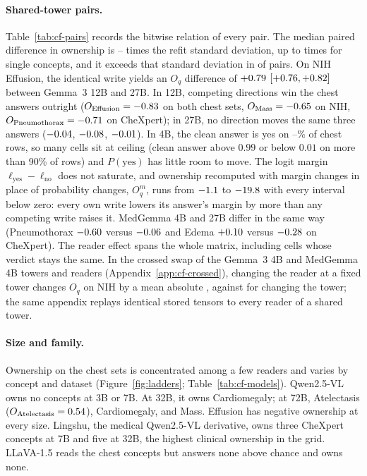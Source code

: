 \documentclass{article}
\begin{document}
\paragraph{Shared-tower pairs.} Table~\ref{tab:cf-pairs} records the bitwise relation of every pair. The median paired difference in ownership is \cfPairsRatioMin{}--\cfPairsRatioMax{} times the refit standard deviation, up to \cfPairsRatioSingleMax{} times for single concepts, and it exceeds that standard deviation in \cfPairsRatioAboveOne{} of \cfPairsRatioN{} pairs. On NIH Effusion, the identical write yields an $O_q$ difference of $+0.79$ $[+0.76,+0.82]$ between Gemma~3 12B and 27B. In 12B, competing directions win the chest answers outright ($O_{\mathrm{Effusion}}=-0.83$ on both chest sets, $O_{\mathrm{Mass}}=-0.65$ on NIH, $O_{\mathrm{Pneumothorax}}=-0.71$ on CheXpert); in 27B, no direction moves the same three answers ($-0.04$, $-0.08$, $-0.01$). In 4B, the clean answer is yes on \cfGemmaFourYesMin--\cfGemmaFourYesMax\% of chest rows, so many cells sit at ceiling (clean answer above $0.99$ or below $0.01$ on more than 90\% of rows) and $P(\mathrm{yes})$ has little room to move. The logit margin $\ell_{\mathrm{yes}}-\ell_{\mathrm{no}}$ does not saturate, and ownership recomputed with margin changes in place of probability changes, $O^m_q$, runs from $-1.1$ to $-19.8$ with every interval below zero: every own write lowers its answer's margin by more than any competing write raises it. MedGemma 4B and 27B differ in the same way (Pneumothorax $-0.60$ versus $-0.06$ and Edema $+0.10$ versus $-0.28$ on CheXpert). The reader effect spans the whole matrix, including cells whose verdict stays the same. In the crossed swap of the Gemma~3 4B and MedGemma 4B towers and readers (Appendix~\ref{app:cf-crossed}), changing the reader at a fixed tower changes $O_q$ on NIH by a mean absolute \cfSwapReaderNihOMin{}, against \cfSwapTowerNihOMin{} for changing the tower; the same appendix replays identical stored tensors to every reader of a shared tower.

\paragraph{Size and family.} Ownership on the chest sets is concentrated among a few readers and varies by concept and dataset (Figure~\ref{fig:ladders}; Table~\ref{tab:cf-models}). Qwen2.5-VL owns no concepts at 3B or 7B. At 32B, it owns Cardiomegaly; at 72B, Atelectasis ($O_{\mathrm{Atelectasis}}=0.54$), Cardiomegaly, and Mass. Effusion has negative ownership at every size. Lingshu, the medical Qwen2.5-VL derivative, owns three CheXpert concepts at 7B and five at 32B, the highest clinical ownership in the grid. LLaVA-1.5 reads the chest concepts but answers none above chance and owns none.
\end{document}
